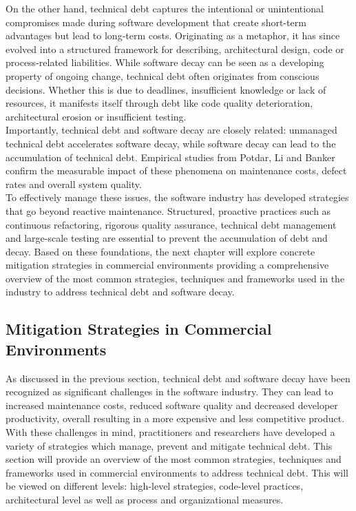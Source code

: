 On the other hand, technical debt captures the intentional or unintentional compromises made during software development that create short-term advantages but lead to long-term costs. Originating as a metaphor, it has since evolved into a structured framework for describing, architectural design, code or process-related liabilities.
While software decay can be seen as a developing property of ongoing change, technical debt often originates from conscious decisions. Whether this is due to deadlines, insufficient knowledge or lack of resources, it manifests itself through debt like code quality deterioration, architectural erosion or insufficient testing.\\

Importantly, technical debt and software decay are closely related: unmanaged technical debt accelerates software decay, while software decay can lead to the accumulation of technical debt. Empirical studies from Potdar, Li and Banker confirm the measurable impact of these phenomena on maintenance costs, defect rates and overall system quality.\\

To effectively manage these issues, the software industry has developed strategies that go beyond reactive maintenance. Structured, proactive practices such as continuous refactoring, rigorous quality assurance, technical debt management and large-scale testing are essential to prevent the accumulation of debt and decay.
Based on these foundations, the next chapter will explore concrete mitigation strategies in commercial environments providing a comprehensive overview of the most common strategies, techniques and frameworks used in the industry to address technical debt and software decay.\\

\subsection{Mitigation Strategies in Commercial Environments}
As discussed in the previous section, technical debt and software decay have been recognized as significant challenges in the software industry. They can lead to 
increased maintenance costs, reduced software quality and decreased developer productivity, overall resulting in a more expensive and less competitive product.
With these challenges in mind, practitioners and researchers have developed a variety of strategies which manage, prevent and mitigate technical debt.
This section will provide an overview of the most common strategies, techniques and frameworks used in commercial environments to address technical debt.
This will be viewed on different levels: high-level strategies, code-level practices, architectural level as well as process and organizational measures.\\

